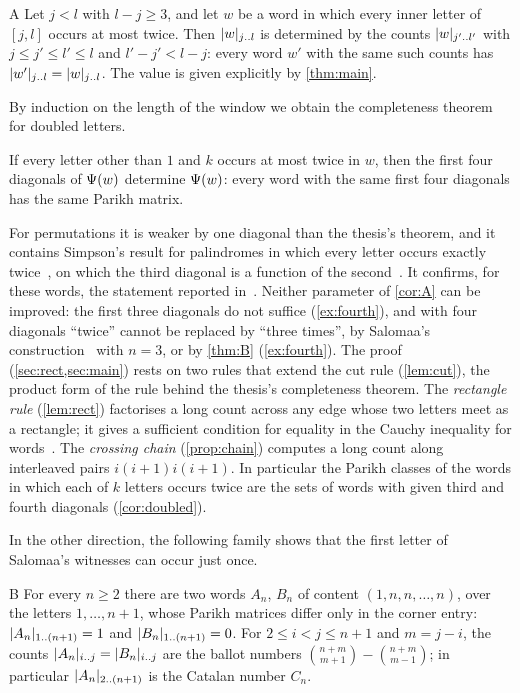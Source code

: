 \documentclass[11pt,a4paper]{article}
\begin{document}
\begin{maintheorem}{A}\label{thm:A}
Let $j<l$ with $l-j\ge3$, and let $w$ be a word in which every inner letter of $[j,l]$ occurs at most twice. Then $\lvert w\rvert_{j\mathinner{\ldotp\ldotp} l}$ is determined by the counts $\lvert w\rvert_{j'\mathinner{\ldotp\ldotp} l'}$ with $j\le j'\le l'\le l$ and $l'-j'<l-j$: every word $w'$ with the same such counts has $\lvert w'\rvert_{j\mathinner{\ldotp\ldotp} l}=\lvert w\rvert_{j\mathinner{\ldotp\ldotp} l}$. The value is given explicitly by \cref{thm:main}.
\end{maintheorem}

By induction on the length of the window we obtain the completeness theorem for doubled letters.

\begin{corollary}\label{cor:A}
If every letter other than $1$ and $k$ occurs at most twice in $w$, then the first four diagonals of $\Psi(w)$ determine $\Psi(w)$: every word with the same first four diagonals has the same Parikh matrix.
\end{corollary}

For permutations it is weaker by one diagonal than the thesis's theorem, and it contains Simpson's result for palindromes in which every letter occurs exactly twice~\cite[Corollary~4, p.~331]{Sim20}, on which the third diagonal is a function of the second~\cite[Theorem~3(b)]{Sim20}. It confirms, for these words, the statement reported in~\cite[p.~228]{Sal06}. Neither parameter of \cref{cor:A} can be improved: the first three diagonals do not suffice (\cref{ex:fourth}), and with four diagonals ``twice'' cannot be replaced by ``three times'', by Salomaa's construction~\cite[Lemma~3 and proof of Theorem~4]{Sal06} with $n=3$, or by \cref{thm:B} (\cref{ex:fourth}). The proof (\cref{sec:rect,sec:main}) rests on two rules that extend the cut rule (\cref{lem:cut}), the product form of the rule behind the thesis's completeness theorem. The \emph{rectangle rule} (\cref{lem:rect}) factorises a long count across any edge whose two letters meet as a rectangle; it gives a sufficient condition for equality in the Cauchy inequality for words~\cite{MSY04,Sal05}. The \emph{crossing chain} (\cref{prop:chain}) computes a long count along interleaved pairs $i(i+1)i(i+1)$. In particular the Parikh classes of the words in which each of $k$ letters occurs twice are the sets of words with given third and fourth diagonals (\cref{cor:doubled}).

In the other direction, the following family shows that the first letter of Salomaa's witnesses can occur just once.

\begin{maintheorem}{B}\label{thm:B}
For every $n\ge2$ there are two words $A_n$, $B_n$ of content $(1,n,n,\dots,n)$, over the letters $1,\dots,n+1$, whose Parikh matrices differ only in the corner entry: $\lvert A_n\rvert_{1\mathinner{\ldotp\ldotp}(n+1)}=1$ and $\lvert B_n\rvert_{1\mathinner{\ldotp\ldotp}(n+1)}=0$. For $2\le i<j\le n+1$ and $m=j-i$, the counts $\lvert A_n\rvert_{i\mathinner{\ldotp\ldotp} j}=\lvert B_n\rvert_{i\mathinner{\ldotp\ldotp} j}$ are the ballot numbers $\binom{n+m}{m+1}-\binom{n+m}{m-1}$; in particular $\lvert A_n\rvert_{2\mathinner{\ldotp\ldotp}(n+1)}$ is the Catalan number $C_n$.
\end{maintheorem}
\end{document}

